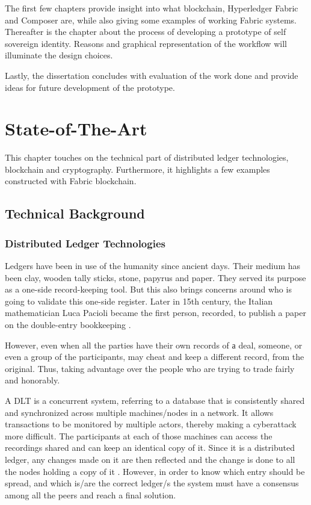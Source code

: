 \documentclass[a4paper,11pt]{report}
\begin{document}
The first few chapters provide insight into what blockchain, Hyperledger Fabric and Composer are, while also giving some examples of working Fabric systems. Thereafter is the chapter about the process of developing a prototype of self sovereign identity. Reasons and graphical representation of the workflow will illuminate the design choices. 

Lastly, the dissertation concludes with evaluation of the work done and provide ideas for future development of the prototype.   
  



\chapter{State-of-The-Art}
\label{state}

This chapter touches on the technical part of distributed ledger technologies, blockchain and cryptography. Furthermore, it highlights a few examples constructed with Fabric blockchain. 
 
\section{Technical Background}
\subsection{Distributed Ledger Technologies}

\label{dlt}

Ledgers have been in use of the humanity since ancient days. Their medium has been clay, wooden tally sticks, stone, papyrus and paper. They served its purpose as a one-side record-keeping tool. But this also brings concerns around who is going to validate this one-side register. Later in 15th century, the Italian mathematician Luca Pacioli became the first person, recorded, to publish a paper on the double-entry bookkeeping \cite{ledgers}.

However, even when all the parties have their own records of а deal, someone, or even a group of the participants, may cheat and keep a different record, from the original. Thus, taking advantage over the people who are trying to trade fairly and honorably.

A DLT is a concurrent system, referring to a database that is consistently shared and synchronized across multiple machines/nodes in a network. It allows transactions to be monitored by multiple actors, thereby making a cyberattack more difficult. The participants at each of those machines can access the recordings shared and can keep an identical copy of it. Since it is a distributed ledger, any changes made on it are then reflected and the change is done to all the nodes holding a copy of it \cite{dltref} . However, in order to know which entry should be spread, and which is/are the correct ledger/s the system must have a consensus among all the peers and reach a final solution.
\end{document}
